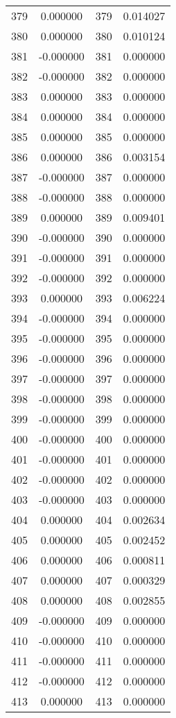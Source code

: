 \documentclass[12pt]{article}
\begin{document}
\begin{longtable}{@{}cccc@{}}
379 & 0.000000 & 379 & 0.014027 \\
380 & 0.000000 & 380 & 0.010124 \\
381 & -0.000000 & 381 & 0.000000 \\
382 & -0.000000 & 382 & 0.000000 \\
383 & 0.000000 & 383 & 0.000000 \\
384 & 0.000000 & 384 & 0.000000 \\
385 & 0.000000 & 385 & 0.000000 \\
386 & 0.000000 & 386 & 0.003154 \\
387 & -0.000000 & 387 & 0.000000 \\
388 & -0.000000 & 388 & 0.000000 \\
389 & 0.000000 & 389 & 0.009401 \\
390 & -0.000000 & 390 & 0.000000 \\
391 & -0.000000 & 391 & 0.000000 \\
392 & -0.000000 & 392 & 0.000000 \\
393 & 0.000000 & 393 & 0.006224 \\
394 & -0.000000 & 394 & 0.000000 \\
395 & -0.000000 & 395 & 0.000000 \\
396 & -0.000000 & 396 & 0.000000 \\
397 & -0.000000 & 397 & 0.000000 \\
398 & -0.000000 & 398 & 0.000000 \\
399 & -0.000000 & 399 & 0.000000 \\
400 & -0.000000 & 400 & 0.000000 \\
401 & -0.000000 & 401 & 0.000000 \\
402 & -0.000000 & 402 & 0.000000 \\
403 & -0.000000 & 403 & 0.000000 \\
404 & 0.000000 & 404 & 0.002634 \\
405 & 0.000000 & 405 & 0.002452 \\
406 & 0.000000 & 406 & 0.000811 \\
407 & 0.000000 & 407 & 0.000329 \\
408 & 0.000000 & 408 & 0.002855 \\
409 & -0.000000 & 409 & 0.000000 \\
410 & -0.000000 & 410 & 0.000000 \\
411 & -0.000000 & 411 & 0.000000 \\
412 & -0.000000 & 412 & 0.000000 \\
413 & 0.000000 & 413 & 0.000000 \\

\end{longtable}
\end{document}
